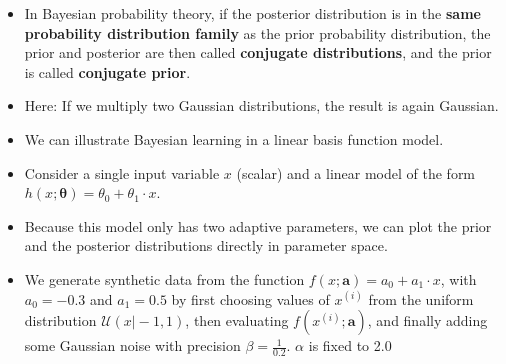 \begin{frame}
	\begin{itemize}
		\item In Bayesian probability theory, if the posterior distribution is in the
			\textbf{same probability distribution family} as the prior probability distribution, the prior and posterior are then called \textbf{conjugate distributions},
			and the prior is called \textbf{conjugate prior}.
		 \item Here: If we multiply two Gaussian distributions, the result is again Gaussian.
	\end{itemize}
	\vspace*{2mm}
	\begin{itemize}
		\item We can illustrate Bayesian learning in a linear basis function model.
		\item Consider a single input variable $x$ (scalar) and a linear model of the form $h(x; \bm{\theta}) = \theta_0 + \theta_1 \cdot x$.
		\item Because this model only has two adaptive parameters, we can plot the prior and the posterior distributions directly in parameter space.
		\item We generate synthetic data from the function $f(x; \bm{a}) = a_0 + a_1 \cdot x$, with $a_0 = -0.3$ and $a_1 = 0.5$ by first choosing values of $x^{(i)}$ from the
			uniform distribution $\mathcal{U}(x \vert -1, 1)$, then evaluating $f(x^{(i)}; \bm{a})$, and finally adding some Gaussian noise with precision $\beta = \frac{1}{0.2}$.
			$\alpha$ is fixed to 2.0
	\end{itemize}
\end{frame}


